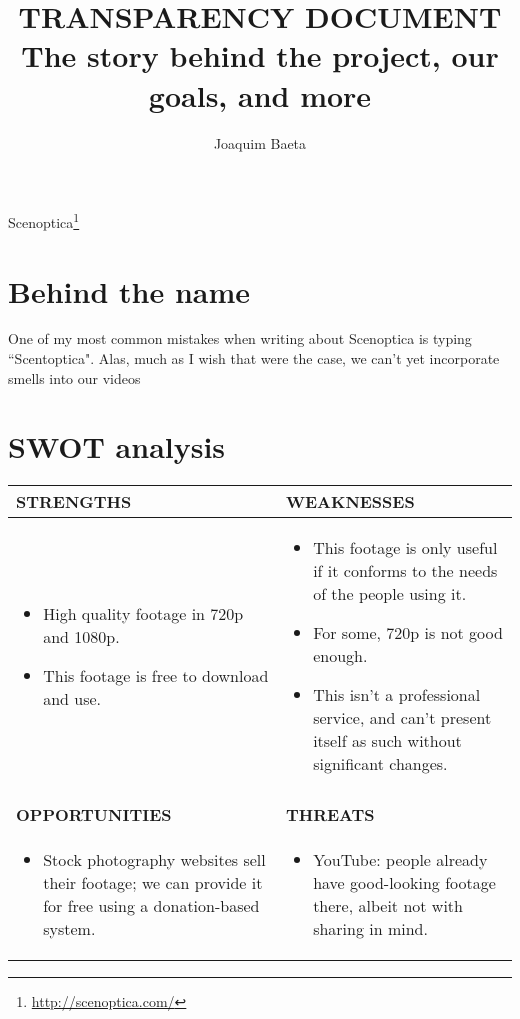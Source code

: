 \documentclass[12pt, a4paper]{article}
\title{\Huge \textbf{TRANSPARENCY DOCUMENT} \\ \Large \textbf{The story behind the project, our goals, and more} }
\author{Joaquim Baeta}
\begin{document}
\maketitle

Scenoptica\footnote{\url{http://scenoptica.com/}}

\section*{Behind the name}

One of my most common mistakes when writing about Scenoptica is typing ``Scentoptica". Alas, much as I wish that were the case, we can't yet incorporate smells into our videos \\

\restoregeometry
{}

\newpage
\section*{SWOT analysis}
\begin{minipage}{\textwidth}
\begin{tabularx}{\textwidth}{>{\raggedright\arraybackslash}p{5.9cm} | >{\raggedright\arraybackslash}p{6.5cm}}
\bf STRENGTHS & \bf WEAKNESSES \\\midrule
\begin{itemize}
\item{High quality footage in 720p and 1080p.}
\item{This footage is free to download and use.}
\end{itemize} & \begin{itemize}
\item{This footage is only useful if it conforms to the needs of the people using it.}
\item{For some, 720p is not good enough.}
\item{This isn't a professional service, and can't present itself as such without significant changes.}
\end{itemize}\\
\\
\bf OPPORTUNITIES & \bf THREATS \\\midrule
\begin{itemize}
\item{Stock photography websites sell their footage; we can provide it for free using a donation-based system.}
\end{itemize} & \begin{itemize}
\item{YouTube: people already have good-looking footage there, albeit not with sharing in mind.}
\end{itemize}
\end {tabularx}
\end{minipage}
\bigskip
\end{document}
